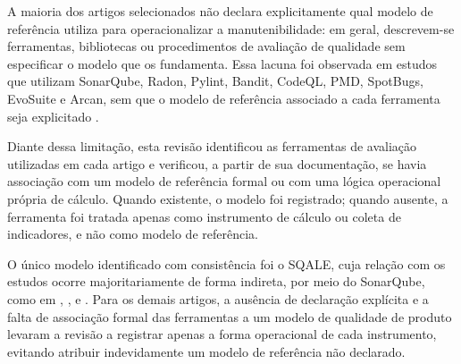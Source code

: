 

A maioria dos artigos selecionados não declara explicitamente qual modelo de referência utiliza para operacionalizar a manutenibilidade: em geral, descrevem-se ferramentas, bibliotecas ou procedimentos de avaliação de qualidade sem especificar o modelo que os fundamenta. Essa lacuna foi observada em estudos que utilizam SonarQube, Radon, Pylint, Bandit, CodeQL, PMD, SpotBugs, EvoSuite e Arcan, sem que o modelo de referência associado a cada ferramenta seja explicitado \cite{abtahiazim2025, KrebsEtAll, NunesEtAll, santamolison2025, blythEtAll}.

Diante dessa limitação, esta revisão identificou as ferramentas de avaliação utilizadas em cada artigo e verificou, a partir de sua documentação, se havia associação com um modelo de referência formal ou com uma lógica operacional própria de cálculo. Quando existente, o modelo foi registrado; quando ausente, a ferramenta foi tratada apenas como instrumento de cálculo ou coleta de indicadores, e não como modelo de referência.

O único modelo identificado com consistência foi o SQALE, cuja relação com os estudos ocorre majoritariamente de forma indireta, por meio do SonarQube, como em , ,  e . Para os demais artigos, a ausência de declaração explícita e a falta de associação formal das ferramentas a um modelo de qualidade de produto levaram a revisão a registrar apenas a forma operacional de cada instrumento, evitando atribuir indevidamente um modelo de referência não declarado.

